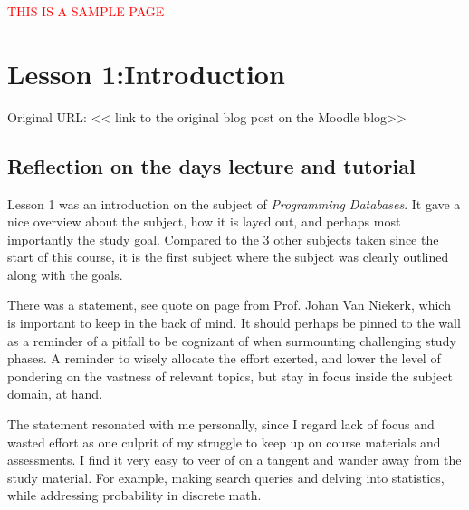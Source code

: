 

{\begin{center}
    \textcolor{red}{\Huge{THIS IS A SAMPLE PAGE}}
\end{center}


\section{Lesson 1:Introduction} %

Original URL: << link to the original blog post on the Moodle blog>> %

\subsection{Reflection on the days lecture and tutorial}

Lesson 1 was an introduction on the subject of {\emph{Programming Databases}}. It gave a nice overview about the subject, how it is layed out, and perhaps most importantly the study goal. Compared to the 3 other subjects taken since the start of this course, it is the first subject where the subject was clearly outlined along with the goals.


There was a statement, see quote on page \pageref{quote} from Prof. Johan Van Niekerk, which is important to keep in the back of mind. It should perhaps be pinned to the wall as a reminder of a pitfall to be cognizant of when surmounting challenging study phases. A reminder to wisely allocate the effort exerted, and lower the level of pondering on the vastness of relevant topics, but stay in focus inside the subject domain, at hand.


The statement resonated with me personally, since I regard lack of focus and wasted effort as one culprit of my struggle to keep up on course materials and assessments. I find it very easy to veer of on a tangent and wander away from the study material. For example, making search queries and delving into statistics, while addressing probability in discrete math.




}
